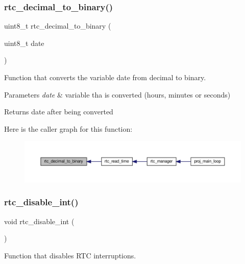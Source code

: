 \subsubsection{\texorpdfstring{rtc\+\_\+decimal\+\_\+to\+\_\+binary()}{rtc\_decimal\_to\_binary()}}
{\footnotesize\ttfamily uint8\+\_\+t rtc\+\_\+decimal\+\_\+to\+\_\+binary (\begin{DoxyParamCaption}\item[{uint8\+\_\+t}]{date }\end{DoxyParamCaption})}



Function that converts the variable date from decimal to binary. 


\begin{DoxyParams}{Parameters}
{\em date} & variable tha is converted (hours, minutes or seconds)\\
\hline
\end{DoxyParams}
\begin{DoxyReturn}{Returns}
date after being converted 
\end{DoxyReturn}
Here is the caller graph for this function\+:
\nopagebreak
\begin{figure}[H]
\begin{center}
\leavevmode
\includegraphics[width=350pt]{group__rtc_ga862729c9ed50edc422841b6b8bc5aa43_icgraph}
\end{center}
\end{figure}
\mbox{\label{group__rtc_ga0f8758bf0df6766696104c3be6c0c6ea}} 
\subsubsection{\texorpdfstring{rtc\+\_\+disable\+\_\+int()}{rtc\_disable\_int()}}
{\footnotesize\ttfamily void rtc\+\_\+disable\+\_\+int (\begin{DoxyParamCaption}{ }\end{DoxyParamCaption})}



Function that disables R\+TC interruptions. 

